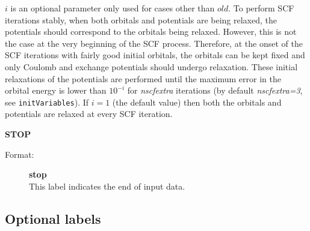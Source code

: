 \documentclass[10pt,a4paper]{article}
\newcommand{\ft}[1]{\texttt{#1}}
\begin{document}
\begin{description}
\begin{description}
$i$ is an optional parameter only used for cases other than $old$. To
perform SCF iterations stably, when both orbitals and potentials are being
relaxed, the potentials should correspond to the orbitals being
relaxed. However, this is not the case at the very beginning of the SCF
process. Therefore, at the onset of the SCF iterations with fairly good
initial orbitals, the orbitals can be kept fixed and only Coulomb and
exchange potentials should undergo relaxation. These initial relaxations of
the potentials are performed until the maximum error in the orbital energy
is lower than $10^{-i}$ for \textsl{nscfextra} iterations (by default
\textsl{nscfextra=3}, see \ft{initVariables}). If $i=1$ (the default value)
then both the orbitals and potentials are relaxed at every SCF iteration.
\end{description}

\item \textbf{STOP}
\begin{description}
\item[Format:] \textbf{stop}\\
This label indicates the end of input data.
\end{description}

\end{description}

\subsection{Optional labels}
\end{document}
